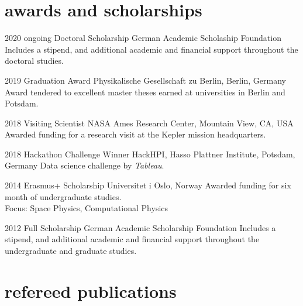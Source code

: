 \documentclass[]{k-cv} %
\begin{document}
\section{awards and scholarships}

\begin{entrylist}
\entry
{2020 \to ongoing}
{Doctoral Scholarship}
{German Academic Scholaship Foundation}
{Includes a stipend, and additional academic and financial support throughout the doctoral studies.}

\entry
{2019}
{Graduation Award}
{Physikalische Gesellschaft zu Berlin, Berlin, Germany}
{Award tendered to excellent master theses earned at universities in Berlin and Potsdam.}


\entry
{2018}
{Visiting Scientist}
{NASA Ames Research Center, Mountain View, CA, USA}
{Awarded funding for a research visit at the Kepler mission headquarters.}

\entry
{2018}
{Hackathon Challenge Winner}
{HackHPI, Hasso Plattner Institute, Potsdam, Germany}
{Data science challenge by \emph{Tableau}.}

\entry
{2014}
{Erasmus+ Scholarship}
{Universitet i Oslo, Norway}
{Awarded funding for six month of undergraduate studies.\\
Focus: Space Physics, Computational Physics}

\entry
{2012 }
{Full Scholarship}
{German Academic Scholarship Foundation}
{Includes a stipend, and additional academic and financial support throughout the undergraduate and graduate studies.}

\end{entrylist}





\section{refereed publications}
\end{document}
